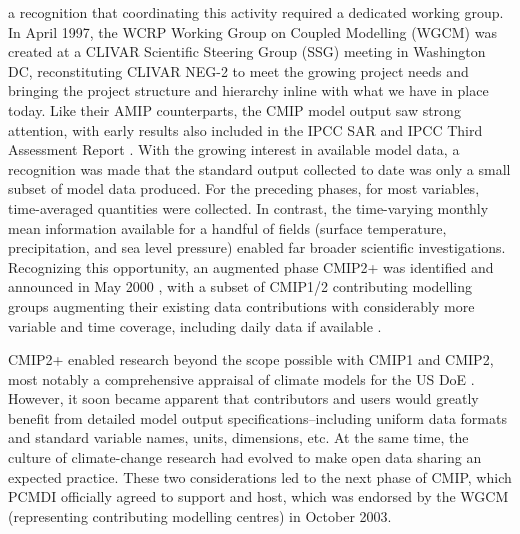 \documentclass[gmd, preprint]{copernicus}
\begin{document}
a recognition that coordinating this activity required a dedicated working group. In April 1997, the WCRP Working Group on Coupled Modelling (WGCM) was created at a CLIVAR Scientific Steering Group (SSG) meeting in Washington DC, reconstituting CLIVAR NEG-2 to meet the growing project needs \citep{detemmerman_clivar_1997} and bringing the project structure and hierarchy inline with what we have in place today. Like their AMIP counterparts, the CMIP model output saw strong attention, with early results also included in the IPCC SAR \citep{gates_climate_1996} and IPCC Third Assessment Report \citep[TAR;][]{mcavaney_model_2001}. With the growing interest in available model data, a recognition was made that the standard output collected to date was only a small subset of model data produced. For the preceding phases, for most variables, time-averaged quantities were collected. In contrast, the time-varying monthly mean information available for a handful of fields (surface temperature, precipitation, and sea level pressure) enabled far broader scientific investigations. Recognizing this opportunity, an augmented phase CMIP2+ was identified and announced in May 2000 \citep{villwock_6th_2003, meehl_cmip_2003, meehl_overview_2005}, with a subset of CMIP1/2 contributing modelling groups augmenting their existing data contributions with considerably more variable and time coverage, including daily data if available \citep{achutarao_pcmdi_2004}.

CMIP2+ enabled research beyond the scope possible with CMIP1 and CMIP2, most notably a comprehensive appraisal of climate models for the US DoE \citep{achutarao_pcmdi_2004}. However, it soon became apparent that contributors and users would greatly benefit from detailed model output specifications--including uniform data formats and standard variable names, units, dimensions, etc. At the same time, the culture of climate-change research had evolved to make open data sharing an expected practice. These two considerations led to the next phase of CMIP, which PCMDI officially agreed to support and host, which was endorsed by the WGCM (representing contributing modelling centres) in October 2003.
\end{document}
